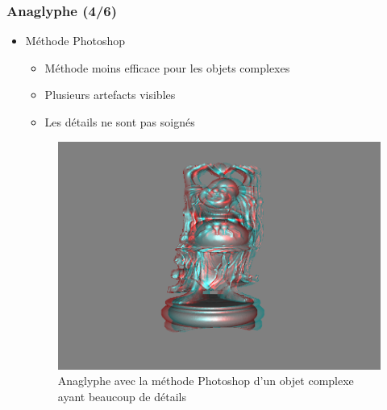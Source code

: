 \documentclass{beamer}
\begin{document}
%
\begin{frame}
\frametitle{Anaglyphe (4/6)}
\begin{itemize}[label=$\bullet$]
\item Méthode Photoshop \cite{stereoAnaglyph}
	\begin{itemize}[label=$\circ$]
	\item Méthode moins efficace pour les objets complexes 
	\item Plusieurs artefacts visibles
	\item Les détails ne sont pas soignés
	\end{itemize}
\begin{figure}
\centering
\includegraphics[scale=0.3]{happy_photoshop.png}
\caption{Anaglyphe avec la méthode Photoshop d'un objet complexe ayant beaucoup de détails }
\end{figure}
	
\end{itemize}

\end{frame}
\end{document}
